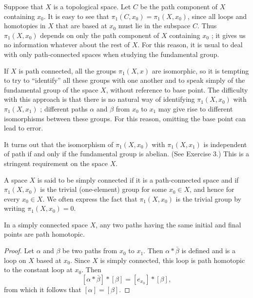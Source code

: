 Suppose that \(X\) is a topological space. Let \(C\) be the path component of \(X\) containing \(x_{0}\). It is easy to see that \({\pi }_{1}( {C,x_{0}}) = {\pi }_{1}( {X,x_{0}})\), since all loops and homotopies in \(X\) that are based at \(x_{0}\) must lie in the subspace \(C\). Thus \({\pi }_{1}( {X,x_{0}})\) depends on only the path component of \(X\) containing \(x_{0}\) ; it gives us no information whatever about the rest of \(X\). For this reason, it is usual to deal with only path-connected spaces when studying the fundamental group.

If \(X\) is path connected, all the groups \({\pi }_{1}( {X,x})\) are isomorphic, so it is tempting to try to ``identify'' all these groups with one another and to speak simply of the fundamental group of the space \(X\), without reference to base point. The difficulty with this approach is that there is no natural way of identifying \({\pi }_{1}( {X,x_{0}})\) with \({\pi }_{1}( {X,x_{1}})\) ; different paths \(\alpha\) and \(\beta\) from \(x_{0}\) to \(x_{1}\) may give rise to different isomorphisms between these groups. For this reason, omitting the base point can lead to error.

It turns out that the isomorphism of \({\pi }_{1}( {X,x_{0}})\) with \({\pi }_{1}( {X,x_{1}})\) is independent of path if and only if the fundamental group is abelian. (See Exercise 3.) This is a stringent requirement on the space \(X\).

\begin{definition}
A space \(X\) is said to be simply connected if it is a path-connected space and if \({\pi }_{1}( {X,x_{0}})\) is the trivial (one-element) group for some \(x_{0} \in X\), and hence for every \(x_{0} \in X\). We often express the fact that \({\pi }_{1}( {X,x_{0}})\) is the trivial group by writing \({\pi }_{1}( {X,x_{0}}) = 0.\)
\end{definition}

\begin{lemma}
\label{lem:\thetheorem}
In a simply connected space \(X\), any two paths having the same initial and final points are path homotopic.
\end{lemma}

\begin{proof}
Let \(\alpha\) and \(\beta\) be two paths from \(x_{0}\) to \(x_{1}\). Then \(\alpha * \bar{\beta }\) is defined and is a loop on \(X\) based at \(x_{0}\). Since \(X\) is simply connected, this loop is path homotopic to the constant loop at \(x_{0}\). Then
\[
[ {\alpha * \bar{\beta }}] * [ \beta ] = [ e_{x_{0}}] * [ \beta ] ,
\]
from which it follows that \([ \alpha ] = [ \beta ]\).
\end{proof}

